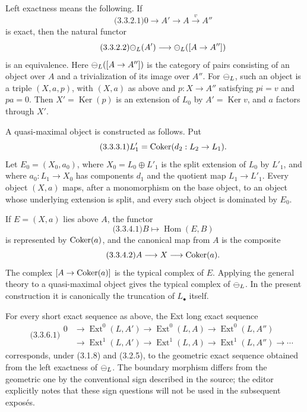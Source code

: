 \documentclass[11pt]{article}
\providecommand{\Ker}{\operatorname{Ker}}
\providecommand{\Hom}{\operatorname{Hom}}
\providecommand{\Ext}{\operatorname{Ext}}
\begin{document}
Left exactness means the following.  If
\begin{equation}\qquad\text{(3.3.2.1)}
  0\longrightarrow A'\longrightarrow A\xrightarrow{v}A''
\end{equation}
is exact, then the natural functor
\begin{equation}\qquad\text{(3.3.2.2)}
  \mathcal\Psi_L(A')\longrightarrow \mathcal\Psi_L([A\to A''])
\end{equation}
is an equivalence.  Here \(\mathcal\Psi_L([A\to A''])\) is the category of pairs consisting of an object over \(A\) and a trivialization of its image over \(A''\).  For \(\mathcal\Psi_L\), such an object is a triple \((X,a,p)\), with \((X,a)\) as above and \(p:X\to A''\) satisfying \(p i=v\) and \(p a=0\).  Then \(X'=\Ker(p)\) is an extension of \(L_0\) by \(A'=\Ker v\), and \(a\) factors through \(X'\).

A quasi-maximal object is constructed as follows.  Put
\begin{equation}\qquad\text{(3.3.3.1)}
  L'_1=\operatorname{Coker}(d_2:L_2\to L_1).
\end{equation}
Let \(E_0=(X_0,a_0)\), where \(X_0=L_0\oplus L'_1\) is the split extension of \(L_0\) by \(L'_1\), and where \(a_0:L_1\to X_0\) has components \(d_1\) and the quotient map \(L_1\to L'_1\).  Every object \((X,a)\) maps, after a monomorphism on the base object, to an object whose underlying extension is split, and every such object is dominated by \(E_0\).

If \(E=(X,a)\) lies above \(A\), the functor
\begin{equation}\qquad\text{(3.3.4.1)}
  B\longmapsto \Hom(E,B)
\end{equation}
is represented by \(\operatorname{Coker}(a)\), and the canonical map from \(A\) is the composite
\begin{equation}\qquad\text{(3.3.4.2)}
  A\longrightarrow X\longrightarrow \operatorname{Coker}(a).
\end{equation}
The complex \([A\to\operatorname{Coker}(a)]\) is the typical complex of \(E\).  Applying the general theory to a quasi-maximal object gives the typical complex of \(\mathcal\Psi_L\).  In the present construction it is canonically the truncation of \(L_\bullet\) itself.

For every short exact sequence as above, the Ext long exact sequence
\begin{equation}\qquad\text{(3.3.6.1)}
\begin{aligned}
0&\to\Ext^0(L,A')\to\Ext^0(L,A)\to\Ext^0(L,A'')\\
 &\to\Ext^1(L,A')\to\Ext^1(L,A)\to\Ext^1(L,A'')\to\cdots
\end{aligned}
\end{equation}
corresponds, under (3.1.8) and (3.2.5), to the geometric exact sequence obtained from the left exactness of \(\mathcal\Psi_L\).  The boundary morphism differs from the geometric one by the conventional sign described in the source; the editor explicitly notes that these sign questions will not be used in the subsequent expos\'es.
\end{document}
